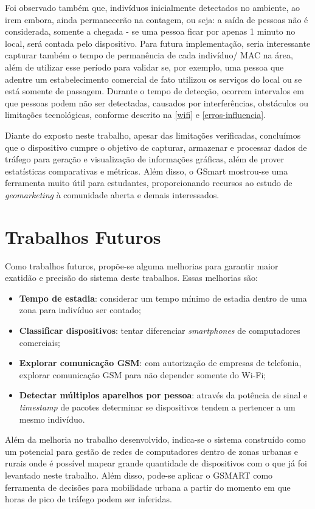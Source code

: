 Foi observado também que, indivíduos inicialmente detectados no ambiente, ao irem embora, ainda permanecerão na contagem, ou seja: a saída de pessoas não é considerada, somente a chegada - se uma pessoa ficar por apenas 1 minuto no local, será contada pelo dispositivo. Para futura implementação, seria interessante capturar também o tempo de permanência de cada indivíduo/ MAC na área, além de utilizar esse período para validar se, por exemplo, uma pessoa que adentre um estabelecimento comercial de fato utilizou os serviços do local ou se está somente de passagem. Durante o tempo de detecção, ocorrem intervalos em que pessoas podem não ser detectadas, causados por interferências, obstáculos ou limitações tecnológicas, conforme descrito na \autoref{wifi} e \autoref{erros-influencia}.

Diante do exposto neste trabalho, apesar das limitações verificadas, concluímos que o dispositivo cumpre o objetivo de capturar, armazenar e processar dados de tráfego para geração e visualização de informações gráficas, além de prover estatísticas comparativas e métricas. Além disso, o GSmart mostrou-se uma ferramenta muito útil para estudantes, proporcionando recursos ao estudo de \emph{geomarketing} à comunidade aberta e demais interessados. 


\section{Trabalhos Futuros}
Como trabalhos futuros, propõe-se alguma melhorias para garantir maior exatidão e
precisão do sistema deste trabalhos. Essas melhorias são:
\begin{itemize}
    \item \textbf{Tempo de estadia}: considerar um tempo mínimo de estadia dentro de uma zona para indivíduo ser
    contado;
    \item \textbf{Classificar dispositivos}: tentar diferenciar \emph{smartphones} de computadores comerciais;
    \item \textbf{Explorar comunicação GSM}: com autorização de empresas de telefonia, explorar comunicação GSM
    para não depender somente do Wi-Fi;
    \item \textbf{Detectar múltiplos aparelhos por pessoa}: através da potência de sinal e \emph{timestamp}
    de pacotes determinar se dispositivos tendem a pertencer a um mesmo indivíduo.
\end{itemize}

Além da melhoria no trabalho desenvolvido, indica-se o sistema construído como um potencial para gestão de redes
de computadores dentro de zonas urbanas e rurais onde é possível mapear grande quantidade de dispositivos com o
que já foi levantado neste trabalho. Além disso, pode-se aplicar o GSMART como ferramenta de decisões para mobilidade
urbana a partir do momento em que horas de pico de tráfego podem ser inferidas.

